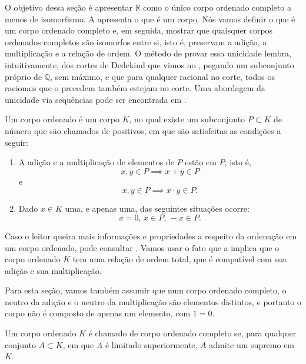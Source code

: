 \documentclass[../main.tex]{subfiles}
\begin{document}
O objetivo dessa seção é apresentar $\mathbb{R}$ como o único corpo ordenado completo a menos de isomorfismo. A  apresenta o que é um corpo. Nós vamos definir o que é um corpo ordenado completo e, em seguida, mostrar que quaisquer corpos ordenados completos são isomorfos entre si, isto é, preservam a adição, a multiplicação e a relação de ordem. O método de provar essa unicidade lembra, intuitivamente, dos cortes de Dedekind que vimos no , pegando um subconjunto próprio de $\mathbb{Q}$, sem máximo, e que para qualquer racional no corte, todos os racionais que o precedem também estejam no corte. Uma abordagem da unicidade via sequências pode ser encontrada em \textcite{hefez-algebra}.

\begin{defi}\label{enum-def-corpoOrdenado}
    Um corpo  ordenado é um corpo $K$, no qual existe um subconjunto $P \subset K$ de número que são chamados de positivos, em que são satisfeitas as condições a seguir:
    \begin{enumerate}
        \item A adição e a multiplicação de elementos de $P$ estão em $P$, isto é, 
        \[ x,y \in P \implies x+y \in P \] e \[ x,y \in P \implies x \cdot y \in P.\]
        \item Dado $x \in K$ uma, e apenas uma, das seguintes situações ocorre: 
        \[x = 0\text{, }x \in P\text{, }-x \in P. \]
    \end{enumerate}
\end{defi}
\begin{obs}
    Caso o leitor queira mais informações e propriedades a respeito da ordenação em um corpo ordenado, pode consultar \textcite[p. 65]{lima-analise-1}.
    Vamos usar o fato que a  implica que o corpo ordenado $K$ tem uma relação de ordem total, que é compatível com sua adição e sua multiplicação.
\end{obs}
\begin{obs}
    Para esta seção, vamos também assumir que num corpo ordenado completo, o neutro da adição e o neutro da multiplicação são elementos distintos, e portanto o corpo não é composto de apenas um elemento, com $1=0$.
\end{obs}
\begin{defi}\label{enum-def-corpoOrdenadoCompleto}
    Um corpo ordenado $K$ é chamado de corpo ordenado completo se, para qualquer conjunto $A \subset K$, em que $A$ é limitado superiormente, $A$ admite um supremo em $K$. 
\end{defi}
\end{document}
